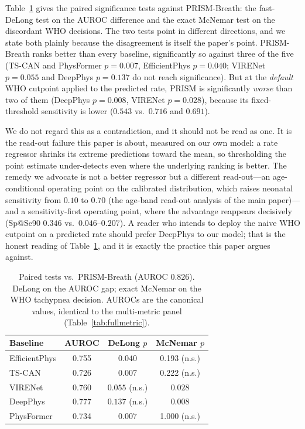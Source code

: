 Table~\ref{tab:paired} gives the paired significance tests against PRISM-Breath: the fast-DeLong test on
the AUROC difference and the exact McNemar test on the discordant WHO decisions. The two tests point in
different directions, and we state both plainly because the disagreement is itself the paper's point.
PRISM-Breath ranks better than every baseline, significantly so against three of the five (TS-CAN and
PhysFormer $p=0.007$, EfficientPhys $p=0.040$; VIRENet $p=0.055$ and DeepPhys $p=0.137$ do not reach
significance). But at the \emph{default} WHO cutpoint applied to the predicted rate, PRISM is
significantly \emph{worse} than two of them (DeepPhys $p=0.008$, VIRENet $p=0.028$), because its
fixed-threshold sensitivity is lower ($0.543$ vs.\ $0.716$ and $0.691$).

We do not regard this as a contradiction, and it should not be read as one. It is the read-out failure
this paper is about, measured on our own model: a rate regressor shrinks its extreme predictions toward
the mean, so thresholding the point estimate under-detects even where the underlying ranking is better.
The remedy we advocate is not a better regressor but a different read-out---an age-conditional operating
point on the calibrated distribution, which raises neonatal sensitivity from $0.10$ to $0.70$
(the age-band read-out analysis of the main paper)---and a sensitivity-first operating point,
where the advantage reappears
decisively (Sp@Se90 $0.346$ vs.\ $0.046$--$0.207$). A reader who intends to deploy the naive WHO cutpoint
on a predicted rate should prefer DeepPhys to our model; that is the honest reading of
Table~\ref{tab:paired}, and it is exactly the practice this paper argues against.

\begin{table}[!t]
\caption{Paired tests vs.\ PRISM-Breath (AUROC $0.826$). DeLong on the AUROC gap; exact McNemar on the WHO
tachypnea decision. AUROCs are the canonical values, identical to the multi-metric panel
(Table~\ref{tab:fullmetric}).}
\label{tab:paired}\centering\small
\begin{tabular}{@{}lccc@{}}\toprule
Baseline & AUROC & DeLong $p$ & McNemar $p$\\\midrule
EfficientPhys & 0.755 & $0.040$ & 0.193 (n.s.)\\
TS-CAN        & 0.726 & $0.007$ & 0.222 (n.s.)\\
VIRENet       & 0.760 & $0.055$ (n.s.) & $\mathbf{0.028}$\\
DeepPhys      & 0.777 & $0.137$ (n.s.) & $\mathbf{0.008}$\\
PhysFormer    & 0.734 & $0.007$ & 1.000 (n.s.)\\\bottomrule
\end{tabular}
\end{table}

